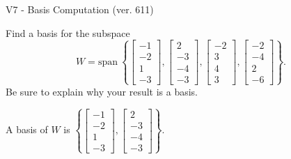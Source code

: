 \begin{exercise}
  \begin{exerciseTitle}V7 - Basis Computation (ver. 611)\end{exerciseTitle}
  \begin{exerciseStatement}
    Find a basis for the subspace 
\[W=\mathrm{span}\ \left\{\left[\begin{array}{r}
-1 \\
-2 \\
1 \\
-3
\end{array}\right] , \left[\begin{array}{r}
2 \\
-3 \\
-4 \\
-3
\end{array}\right] , \left[\begin{array}{r}
-2 \\
3 \\
4 \\
3
\end{array}\right] , \left[\begin{array}{r}
-2 \\
-4 \\
2 \\
-6
\end{array}\right]\right\}.\]
 Be sure to explain why your result is a basis.


  \end{exerciseStatement}
  \begin{exerciseAnswer}
   A basis of \(W\) is  \(\left\{\left[\begin{array}{r}
-1 \\
-2 \\
1 \\
-3
\end{array}\right] , \left[\begin{array}{r}
2 \\
-3 \\
-4 \\
-3
\end{array}\right]\right\}\).
  


  \end{exerciseAnswer}
\end{exercise}